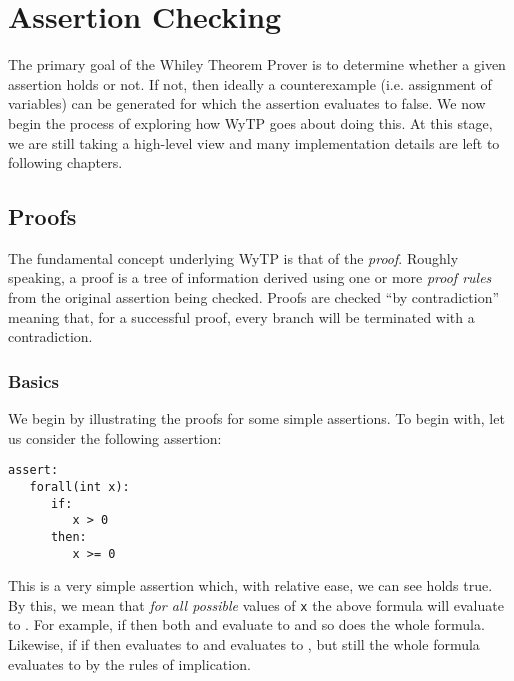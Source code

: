 \chapter{Assertion Checking}

The primary goal of the Whiley Theorem Prover is to determine whether
a given assertion holds or not.  If not, then ideally a counterexample
(i.e. assignment of variables) can be generated for which the
assertion evaluates to false.  We now begin the process of exploring
how WyTP goes about doing this.  At this stage, we are still taking a
high-level view and many implementation details are left to following
chapters.

\section{Proofs}

The fundamental concept underlying WyTP is that of the {\em proof}.
Roughly speaking, a proof is a tree of information derived using one
or more {\em proof rules} from the original assertion being checked.
Proofs are checked ``by contradiction'' meaning that, for a successful
proof, every branch will be terminated with a contradiction.

\subsection{Basics}

We begin by illustrating the proofs for some simple assertions.  To
begin with, let us consider the following assertion:

\begin{tcolorbox}\begin{lstlisting}[language=WyAL]
assert:
   forall(int x):
      if:
         x > 0
      then:
         x >= 0
\end{lstlisting}\end{tcolorbox}

This is a very simple assertion which, with relative ease, we can see
holds true.  By this, we mean that {\em for all possible} values of
\lstinline{x} the above formula will evaluate to .
For example, if  then both  and
 evaluate to  and so does the
whole formula.  Likewise, if if  then  evaluates to  and 
evaluates to , but still the whole formula evaluates
to  by the rules of implication.

